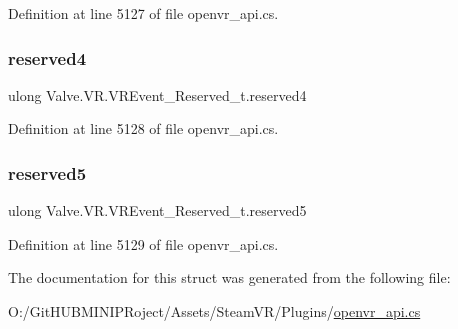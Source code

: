 Definition at line 5127 of file openvr\+\_\+api.\+cs.

\mbox{\label{struct_valve_1_1_v_r_1_1_v_r_event___reserved__t_af780f533d9285efcc29bde160980dcc3}} 
\subsubsection{\texorpdfstring{reserved4}{reserved4}}
{\footnotesize\ttfamily ulong Valve.\+V\+R.\+V\+R\+Event\+\_\+\+Reserved\+\_\+t.\+reserved4}



Definition at line 5128 of file openvr\+\_\+api.\+cs.

\mbox{\label{struct_valve_1_1_v_r_1_1_v_r_event___reserved__t_ae43f8977f4c54906a9284a3411faa32f}} 
\subsubsection{\texorpdfstring{reserved5}{reserved5}}
{\footnotesize\ttfamily ulong Valve.\+V\+R.\+V\+R\+Event\+\_\+\+Reserved\+\_\+t.\+reserved5}



Definition at line 5129 of file openvr\+\_\+api.\+cs.



The documentation for this struct was generated from the following file\+:\begin{DoxyCompactItemize}
\item 
O\+:/\+Git\+H\+U\+B\+M\+I\+N\+I\+P\+Roject/\+Assets/\+Steam\+V\+R/\+Plugins/\mbox{\hyperlink{openvr__api_8cs}{openvr\+\_\+api.\+cs}}\end{DoxyCompactItemize}

